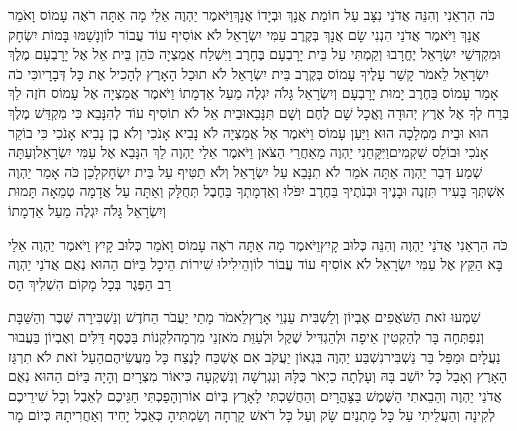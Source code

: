 \documentclass[../main/main.tex]{subfiles}
\begin{document}
\begin{multicols*}{\ncols}
כֹּה הִרְאַנִי וְהִנֵּה אֲדֹנַי נִצָּב עַל חוֹמַת אֲנָךְ וּבְיָדוֹ אֲנָךְ\PreVerseSpace{}וַיֹּאמֶר יַהְוֶה אֵלַי מָה אַתָּה רֹאֶה עָמוֹס וָאֹמַר אֲנָךְ וַיֹּאמֶר אֲדֹנַי הִנְנִי שָׂם אֲנָךְ בְּקֶרֶב עַמִּי יִשְׂרָאֵל לֹא אוֹסִיף עוֹד עֲבוֹר לוֹ\PreVerseSpace{}וְנָשַׁמּוּ בָּמוֹת יִשְׂחָק וּמִקְדְּשֵׁי יִשְׂרָאֵל יֶחֱרָבוּ וְקַמְתִּי עַל בֵּית יָרָבְעָם בֶּחָרֶב \ClosedSection{}וַיִּשְׁלַח אֲמַצְיָה כֹּהֵן בֵּית אֵל אֶל יָרָבְעָם מֶלֶךְ יִשְׂרָאֵל לֵאמֹר קָשַׁר עָלֶיךָ עָמוֹס בְּקֶרֶב בֵּית יִשְׂרָאֵל לֹא תוּכַל הָאָרֶץ לְהָכִיל אֶת כָּל דְּבָרָיו\PreVerseSpace{}כִּי כֹה אָמַר עָמוֹס בַּחֶרֶב יָמוּת יָרָבְעָם וְיִשְׂרָאֵל גָּלֹה יִגְלֶה מֵעַל אַדְמָתוֹ \ClosedSection{}וַיֹּאמֶר אֲמַצְיָה אֶל עָמוֹס חֹזֶה לֵךְ בְּרַח לְךָ אֶל אֶרֶץ יְהוּדָה וֶאֱכָל שָׁם לֶחֶם וְשָׁם תִּנָּבֵא\PreVerseSpace{}וּבֵית אֵל לֹא תוֹסִיף עוֹד לְהִנָּבֵא כִּי מִקְדַּשׁ מֶלֶךְ הוּא וּבֵית מַמְלָכָה הוּא \ClosedSection{}וַיַּעַן עָמוֹס וַיֹּאמֶר אֶל אֲמַצְיָה לֹא נָבִיא אָנֹכִי וְלֹא בֶן נָבִיא אָנֹכִי כִּי בוֹקֵר אָנֹכִי וּבוֹלֵס שִׁקְמִים\PreVerseSpace{}וַיִּקָּחֵנִי יַהְוֶה מֵאַחֲרֵי הַצֹּאן וַיֹּאמֶר אֵלַי יַהְוֶה לֵךְ הִנָּבֵא אֶל עַמִּי יִשְׂרָאֵל\PreVerseSpace{}וְעַתָּה שְׁמַע דְּבַר יַהְוֶה אַתָּה אֹמֵר לֹא תִנָּבֵא עַל יִשְׂרָאֵל וְלֹא תַטִּיף עַל בֵּית יִשְׂחָק\PreVerseSpace{}לָכֵן כֹּה אָמַר יַהְוֶה אִשְׁתְּךָ בָּעִיר תִּזְנֶה וּבָנֶיךָ וּבְנֹתֶיךָ בַּחֶרֶב יִפֹּלוּ וְאַדְמָתְךָ בַּחֶבֶל תְּחֻלָּק וְאַתָּה עַל אֲדָמָה טְמֵאָה תָּמוּת וְיִשְׂרָאֵל גָּלֹה יִגְלֶה מֵעַל אַדְמָתוֹ\OpenSection{}\par
{}כֹּה הִרְאַנִי אֲדֹנַי יַהְוֶה וְהִנֵּה כְּלוּב קָיִץ\PreVerseSpace{}וַיֹּאמֶר מָה אַתָּה רֹאֶה עָמוֹס וָאֹמַר כְּלוּב קָיִץ וַיֹּאמֶר יַהְוֶה אֵלַי בָּא הַקֵּץ אֶל עַמִּי יִשְׂרָאֵל לֹא אוֹסִיף עוֹד עֲבוֹר לוֹ\PreVerseSpace{}וְהֵילִילוּ שִׁירוֹת הֵיכָל בַּיּוֹם הַהוּא נְאֻם אֲדֹנַי יַהְוֶה רַב הַפֶּגֶר בְּכָל מָקוֹם הִשְׁלִיךְ הָס\OpenSection{}\par
{}שִׁמְעוּ זֹאת הַשֹּׁאֲפִים אֶבְיוֹן וְלַשְׁבִּית עַנְוֵי אָרֶץ\PreVerseSpace{}לֵאמֹר מָתַי יַעֲבֹר הַחֹדֶשׁ וְנַשְׁבִּירָה שֶּׁבֶר וְהַשַּׁבָּת וְנִפְתְּחָה בָּר לְהַקְטִין אֵיפָה וּלְהַגְדִּיל שֶׁקֶל וּלְעַוֵּת מֹאזְנֵי מִרְמָה\PreVerseSpace{}לִקְנוֹת בַּכֶּסֶף דַּלִּים וְאֶבְיוֹן בַּעֲבוּר נַעֲלָיִם וּמַפַּל בַּר נַשְׁבִּיר\PreVerseSpace{}נִשְׁבַּע יַהְוֶה בִּגְאוֹן יַעֲקֹב אִם אֶשְׁכַּח לָנֶצַח כָּל מַעֲשֵׂיהֶם\PreVerseSpace{}הַעַל זֹאת לֹא תִרְגַּז הָאָרֶץ וְאָבַל כָּל יוֹשֵׁב בָּהּ וְעָלְתָה כַיְאֹר\SubEnd{} כֻּלָּהּ וְנִגְרְשָׁה וְנִשְׁקְעָה\SubEnd{} כִּיאוֹר מִצְרָיִם \ClosedSection{}וְהָיָה בַּיּוֹם הַהוּא נְאֻם אֲדֹנַי יַהְוֶה וְהֵבֵאתִי הַשֶּׁמֶשׁ בַּצָּהֳרָיִם וְהַחֲשַׁכְתִּי לָאָרֶץ בְּיוֹם אוֹר\PreVerseSpace{}וְהָפַכְתִּי חַגֵּיכֶם לְאֵבֶל וְכָל שִׁירֵיכֶם לְקִינָה וְהַעֲלֵיתִי עַל כָּל מָתְנַיִם שָׂק וְעַל כָּל רֹאשׁ קָרְחָה וְשַׂמְתִּיהָ כְּאֵבֶל יָחִיד וְאַחֲרִיתָהּ כְּיוֹם מָר\OpenSection{}\par

\end{multicols*}
\end{document}
